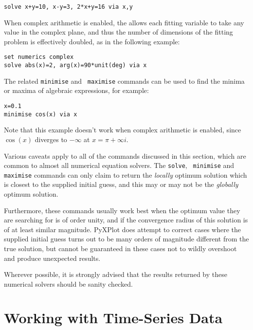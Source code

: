 \begin{verbatim}
solve x+y=10, x-y=3, 2*x+y=16 via x,y
\end{verbatim}

When complex arithmetic is enabled, the  allows each fitting
variable to take any value in the complex plane, and thus the number of
dimensions of the fitting problem is effectively doubled, as in the following
example:

\begin{verbatim}
set numerics complex
solve abs(x)=2, arg(x)=90*unit(deg) via x
\end{verbatim}

The related  {\tt minimise} and {\tt
maximise} commands can be used to find the minima or maxima of algebraic
expressions, for example:

\begin{verbatim}
x=0.1
minimise cos(x) via x
\end{verbatim}

\noindent Note that this example doesn't work when complex arithmetic is
enabled, since $\cos(x)$ diverges to $-\infty$ at $x=\pi+\infty i$.

Various caveats apply to all of the commands discussed in this section, which
are common to almost all numerical equation solvers. The {\tt solve}, {\tt
minimise} and {\tt maximise} commands can only claim to return the {\it
locally} optimum solution which is closest to the supplied initial guess, and
this may or may not be the {\it globally} optimum solution.

Furthermore, these commands usually work best when the optimum value they are
searching for is of order unity, and if the convergence radius of this solution
is of at least similar magnitude. PyXPlot does attempt to correct cases where
the supplied initial guess turns out to be many orders of magnitude different
from the true solution, but cannot be guaranteed in these cases not to wildly
overshoot and produce unexpected results.

Wherever possible, it is strongly advised that the results returned by these
numerical solvers should be sanity checked.


\section{Working with Time-Series Data}
\label{sec:time_series}

